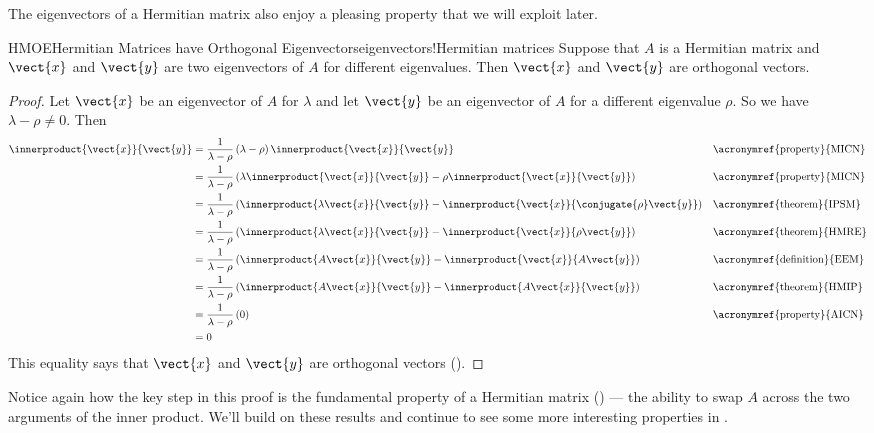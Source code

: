 %
The eigenvectors of a Hermitian matrix also enjoy a pleasing property that we will exploit later.
%
%
\begin{theorem}{HMOE}{Hermitian Matrices have Orthogonal Eigenvectors}{eigenvectors!Hermitian matrices}
Suppose that $A$ is a Hermitian matrix and $\vect{x}$ and $\vect{y}$ are two eigenvectors of $A$ for different eigenvalues.  Then $\vect{x}$ and $\vect{y}$ are orthogonal vectors.
\end{theorem}
%
\begin{proof}
Let $\vect{x}$ be an eigenvector of $A$ for $\lambda$ and let $\vect{y}$ be an eigenvector of $A$ for a different eigenvalue $\rho$.   So we have $\lambda-\rho\neq 0$.  Then
%
\begin{align*}
%
\innerproduct{\vect{x}}{\vect{y}}
%
&=\frac{1}{\lambda-\rho}\left(\lambda-\rho\right)\innerproduct{\vect{x}}{\vect{y}}
&&\text{\acronymref{property}{MICN}}\\
%
&=\frac{1}{\lambda-\rho}
\left(\lambda\innerproduct{\vect{x}}{\vect{y}}-\rho\innerproduct{\vect{x}}{\vect{y}}\right)
&&\text{\acronymref{property}{MICN}}\\
%
&=\frac{1}{\lambda-\rho}
\left(\innerproduct{\lambda\vect{x}}{\vect{y}}-\innerproduct{\vect{x}}{\conjugate{\rho}\vect{y}}\right)
&&\text{\acronymref{theorem}{IPSM}}\\
%
&=\frac{1}{\lambda-\rho}
\left(\innerproduct{\lambda\vect{x}}{\vect{y}}-\innerproduct{\vect{x}}{\rho\vect{y}}\right)
&&\text{\acronymref{theorem}{HMRE}}\\
%
&=\frac{1}{\lambda-\rho}
\left(\innerproduct{A\vect{x}}{\vect{y}}-\innerproduct{\vect{x}}{A\vect{y}}\right)
&&\text{\acronymref{definition}{EEM}}\\
%
&=\frac{1}{\lambda-\rho}
\left(\innerproduct{A\vect{x}}{\vect{y}}-\innerproduct{A\vect{x}}{\vect{y}}\right)
&&\text{\acronymref{theorem}{HMIP}}\\
%
&=\frac{1}{\lambda-\rho}\left(0\right)
&&\text{\acronymref{property}{AICN}}\\
&=0
%
\end{align*}
%
This equality says that $\vect{x}$ and $\vect{y}$ are orthogonal vectors ().
%
\end{proof}
%
Notice again how the key step in this proof is the fundamental property of a Hermitian matrix () --- the ability to swap $A$ across the two arguments of the inner product.  We'll build on these results and continue to see some more interesting properties in .
%
